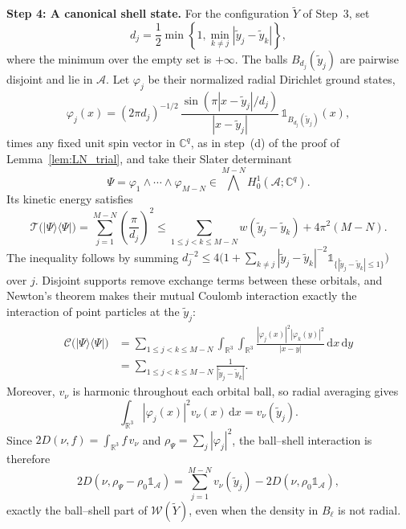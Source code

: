 \documentclass[final,reqno]{amsart}
\theoremstyle{remark}
\theoremstyle{definition}
\renewcommand{\le}{\leqslant}
\newcommand{\RR}{\mathbb{R}}
\newcommand{\CC}{\mathbb{C}}
\newcommand{\iden}{\mathbb{1}}
\newcommand{\TC}{\mathcal{T}}
\newcommand{\Cc}{\mathcal{C}}
\begin{document}
\noindent\textbf{Step 4: A canonical shell state.}
For the configuration $\widetilde Y$ of Step~3, set
\[
d_j=\frac12\min\left\{1,\min_{k\ne j}|\tilde y_j-\tilde y_k|\right\},
\]
where the minimum over the empty set is $+\infty$. The balls $B_{d_j}(\tilde y_j)$ are pairwise disjoint and lie in $\mathcal A$. Let $\varphi_j$ be their normalized radial Dirichlet ground states,
\[
\varphi_j(x)=(2\pi d_j)^{-1/2}\,\frac{\sin(\pi|x-\tilde y_j|/d_j)}{|x-\tilde y_j|}\,\iden_{B_{d_j}(\tilde y_j)}(x),
\]
times any fixed unit spin vector in $\CC^q$, as in step~(d) of the proof of Lemma~\ref{lem:LN_trial}, and take their Slater determinant
\[
\Psi=\varphi_1\wedge\cdots\wedge\varphi_{M-N}\in{\textstyle\bigwedge^{M-N}}H^1_0(\mathcal A;\CC^q).
\]
Its kinetic energy satisfies
\begin{equation}\label{eq:completion_kinetic}
\TC\big(|\Psi\rangle\langle\Psi|\big)
=\sum_{j=1}^{M-N}\left(\frac\pi{d_j}\right)^2
\le\sum_{1\le j<k\le M-N}w(\tilde y_j-\tilde y_k)+4\pi^2(M-N).
\end{equation}
The inequality follows by summing $d_j^{-2}\le4\big(1+\sum_{k\ne j}|\tilde y_j-\tilde y_k|^{-2}\iden_{\{|\tilde y_j-\tilde y_k|\le1\}}\big)$ over $j$.
Disjoint supports remove exchange terms between these orbitals, and Newton's theorem makes their mutual Coulomb interaction exactly the interaction of point particles at the $\tilde y_j$:
\begin{equation}\label{eq:completion_coulomb}
\begin{split}
\Cc\big(|\Psi\rangle\langle\Psi|\big)
&=\sum_{1\le j<k\le M-N}\int_{\RR^3}\int_{\RR^3}\frac{|\varphi_j(x)|^2|\varphi_k(y)|^2}{|x-y|}\,\mathrm dx\,\mathrm dy\\
&=\sum_{1\le j<k\le M-N}\frac1{|\tilde y_j-\tilde y_k|}.
\end{split}
\end{equation}
Moreover, $v_\nu$ is harmonic throughout each orbital ball, so radial averaging gives
\[
\int_{\RR^3}|\varphi_j(x)|^2v_\nu(x)\,\mathrm dx=v_\nu(\tilde y_j).
\]
Since $2D(\nu,f)=\int_{\RR^3}f\,v_\nu$ and $\rho_\Psi=\sum_j|\varphi_j|^2$, the ball--shell interaction is therefore
\begin{equation}\label{eq:completion_core_shell}
2D(\nu,\rho_\Psi-\rho_0\iden_{\mathcal A})=\sum_{j=1}^{M-N}v_\nu(\tilde y_j)-2D(\nu,\rho_0\iden_{\mathcal A}),
\end{equation}
exactly the ball--shell part of $\mathcal W(\widetilde Y)$, even when the density in $B_\ell$ is not radial.
\end{document}
